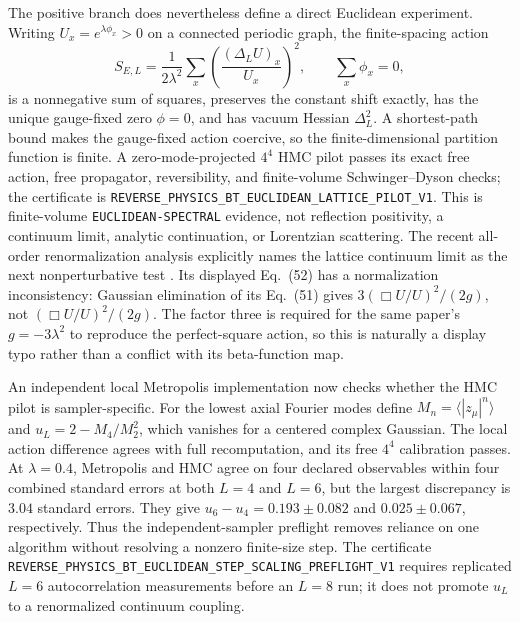 \documentclass[11pt]{article}
\theoremstyle{definition}
\theoremstyle{remark}
\begin{document}
The positive branch does nevertheless define a direct Euclidean experiment.
Writing $U_x=e^{\lambda\phi_x}>0$ on a connected periodic graph, the
finite-spacing action
\begin{equation}\label{eq:bt-euclidean-lattice}
 S_{E,L}=\frac{1}{2\lambda^2}\sum_x
 \left(\frac{(\Delta_LU)_x}{U_x}\right)^2,
 \qquad \sum_x\phi_x=0,
\end{equation}
is a nonnegative sum of squares, preserves the constant shift exactly, has
the unique gauge-fixed zero $\phi=0$, and has vacuum Hessian
$\Delta_L^2$.  A shortest-path bound makes the gauge-fixed action coercive,
so the finite-dimensional partition function is finite.  A
zero-mode-projected $4^4$ HMC pilot passes its exact free
action, free propagator, reversibility, and finite-volume Schwinger--Dyson
checks; the certificate is
\texttt{REVERSE\_PHYSICS\_BT\_EUCLIDEAN\_LATTICE\_PILOT\_V1}.
This is finite-volume \texttt{EUCLIDEAN-SPECTRAL} evidence, not reflection
positivity, a continuum limit, analytic continuation, or Lorentzian
scattering.  The recent all-order renormalization analysis explicitly names
the lattice continuum limit as the next nonperturbative test
\cite{ABHT2026}.  Its displayed Eq.~(52) has a normalization inconsistency:
Gaussian elimination of its Eq.~(51) gives
$3(\Box U/U)^2/(2g)$, not $(\Box U/U)^2/(2g)$.  The factor three is required
for the same paper's $g=-3\lambda^2$ to reproduce the perfect-square action,
so this is naturally a display typo rather than a conflict with its
beta-function map.

An independent local Metropolis implementation now checks whether the HMC
pilot is sampler-specific.  For the lowest axial Fourier modes define
$M_n=\langle|z_\mu|^n\rangle$ and
$u_L=2-M_4/M_2^2$, which vanishes for a centered complex Gaussian.  The local
action difference agrees with full recomputation, and its free $4^4$
calibration passes.  At $\lambda=0.4$, Metropolis and HMC agree on four declared
observables within four combined standard errors at both $L=4$ and $L=6$, but
the largest discrepancy is $3.04$ standard errors.  They give
$u_6-u_4=0.193\pm0.082$ and $0.025\pm0.067$, respectively.  Thus the
independent-sampler preflight removes reliance on one algorithm without
resolving a nonzero finite-size step.  The certificate
\texttt{REVERSE\_PHYSICS\_BT\_EUCLIDEAN\_STEP\_SCALING\_PREFLIGHT\_V1}
requires replicated $L=6$ autocorrelation measurements before an $L=8$ run;
it does not promote $u_L$ to a renormalized continuum coupling.
\end{document}

